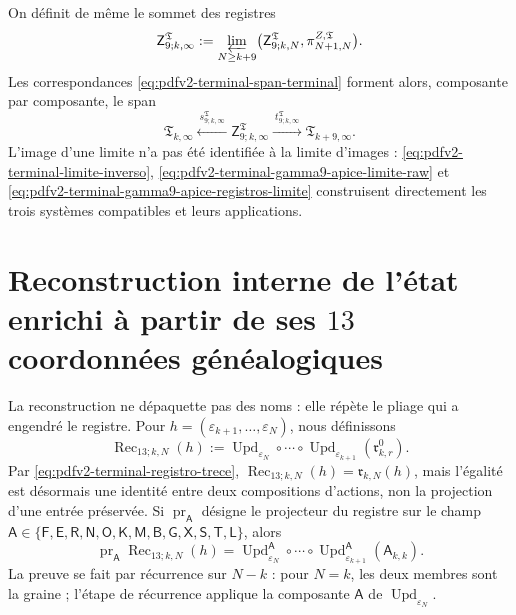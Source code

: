 On définit de même le sommet des registres
\begin{equation}
\label{eq:pdfv2-terminal-gamma9-apice-registros-limite}
 \mathsf Z^{\mathfrak T}_{9;k,\infty}
 :=\varprojlim_{N\geq k+9}
 \bigl(\mathsf Z^{\mathfrak T}_{9;k,N},
       \pi^{Z,\mathfrak T}_{N+1,N}\bigr).
\end{equation}
Les correspondances \eqref{eq:pdfv2-terminal-span-terminal} forment alors, composante par composante, le span
\begin{equation}
\label{eq:pdfv2-terminal-span-limite}
 \mathfrak T_{k,\infty}
 \xleftarrow{\ s^{\mathfrak T}_{9;k,\infty}\ }
 \mathsf Z^{\mathfrak T}_{9;k,\infty}
 \xrightarrow{\ t^{\mathfrak T}_{9;k,\infty}\ }
 \mathfrak T_{k+9,\infty}.
\end{equation}
L'image d'une limite n'a pas été identifiée à la limite d'images : \eqref{eq:pdfv2-terminal-limite-inverso}, \eqref{eq:pdfv2-terminal-gamma9-apice-limite-raw} et \eqref{eq:pdfv2-terminal-gamma9-apice-registros-limite} construisent directement les trois systèmes compatibles et leurs applications.

\section{Reconstruction interne de l'état enrichi à partir de ses \(13\) coordonnées généalogiques}

La reconstruction ne dépaquette pas des noms : elle répète le pliage qui a engendré le registre. Pour \(h=(\varepsilon_{k+1},\ldots,\varepsilon_N)\), nous définissons
\begin{equation}
\label{eq:pdfv2-terminal-recuperacion-trece}
 \boxed{
 \operatorname{Rec}_{13;k,N}(h):=
 \operatorname{Upd}_{\varepsilon_N}\circ\cdots\circ
 \operatorname{Upd}_{\varepsilon_{k+1}}
 (\mathfrak r^0_{k,r}).}
\end{equation}
Par \eqref{eq:pdfv2-terminal-registro-trece}, \(\operatorname{Rec}_{13;k,N}(h)=\mathfrak r_{k,N}(h)\), mais l'égalité est désormais une identité entre deux compositions d'actions, non la projection d'une entrée préservée. Si \(\operatorname{pr}_{\mathsf A}\) désigne le projecteur du registre sur le champ \(\mathsf A\in\{\mathsf F,\mathsf E,\mathsf R,\mathsf N,\mathsf O,
\mathsf K,\mathsf M,\mathsf B,\mathsf G,\mathsf X,\mathsf S,\mathsf T,
\mathsf L\}\), alors
\begin{equation}
\label{eq:pdfv2-terminal-recuperacion-campo-fold}
 \operatorname{pr}_{\mathsf A}\operatorname{Rec}_{13;k,N}(h)
 =\operatorname{Upd}^{\mathsf A}_{\varepsilon_N}\circ\cdots\circ
  \operatorname{Upd}^{\mathsf A}_{\varepsilon_{k+1}}
  (\mathsf A_{k,k}).
\end{equation}
La preuve se fait par récurrence sur \(N-k\) : pour \(N=k\), les deux membres sont la graine ; l'étape de récurrence applique la composante \(\mathsf A\) de \(\operatorname{Upd}_{\varepsilon_N}\).

